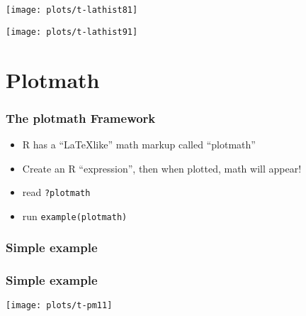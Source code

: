 \documentclass[11pt,english]{beamer}
\begin{document}

\begin{frame}[containsverbatim]






\texttt{[image: plots/t-lathist81]}


\end{frame}



\begin{frame}[containsverbatim]




\texttt{[image: plots/t-lathist91]}

\end{frame}

\section{Plotmath}

\begin{frame}
  \frametitle{The plotmath Framework}

  \begin{itemize}
  \item R has a ``\LaTeX like'' math markup called ``plotmath''
  \item Create an R ``expression'', then when plotted, math will appear!
  \item read \texttt{?plotmath}
    \item run \texttt{example(plotmath)}

  \end{itemize}
\end{frame}


\begin{frame}[containsverbatim]
  \frametitle{Simple example}




\end{frame}


\begin{frame}[containsverbatim]
  \frametitle{Simple example}


\texttt{[image: plots/t-pm11]}
\end{frame}
\end{document}
